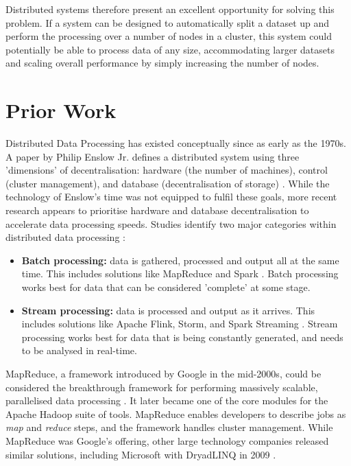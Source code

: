 \pagebreak
Distributed systems therefore present an excellent opportunity for solving this problem. If a system can be designed to automatically split a dataset up and perform the processing over a number of nodes in a cluster, this system could potentially be able to process data of any size, accommodating larger datasets and scaling overall performance by simply increasing the number of nodes.

\section{Prior Work}
Distributed Data Processing has existed conceptually since as early as the 1970s. A paper by Philip Enslow Jr{\frenchspacing.} defines a distributed system using three 'dimensions' of decentralisation: hardware (the number of machines), control (cluster management), and database (decentralisation of storage) \cite{enslow1978distributed}. While the technology of Enslow's time was not equipped to fulfil these goals, more recent research appears to prioritise hardware and database decentralisation to accelerate data processing speeds. Studies identify two major categories within distributed data processing \cite{yaqoob2016big}:
\begin{itemize}
	\item \textbf{Batch processing:} data is gathered, processed and output all at the same time. This includes solutions like MapReduce and Spark \cite{dean2008mapreduce, zaharia2016spark}. Batch processing works best for data that can be considered 'complete' at some stage.
	\item \textbf{Stream processing:} data is processed and output as it arrives. This includes solutions like Apache Flink, Storm, and Spark Streaming \cite{carbone2015flink, toshniwal2014storm, armbrust2018sparkstreaming}. Stream processing works best for data that is being constantly generated, and needs to be analysed in real-time.
\end{itemize}

MapReduce, a framework introduced by Google in the mid-2000s, could be considered the breakthrough framework for performing massively scalable, parallelised data processing \cite{dean2008mapreduce}. It later became one of the core modules for the Apache Hadoop suite of tools. MapReduce enables developers to describe jobs as \textit{map} and \textit{reduce} steps, and the framework handles cluster management. While MapReduce was Google's offering, other large technology companies released similar solutions, including Microsoft with DryadLINQ in 2009 \cite{fetterly2009dryadlinq}.

